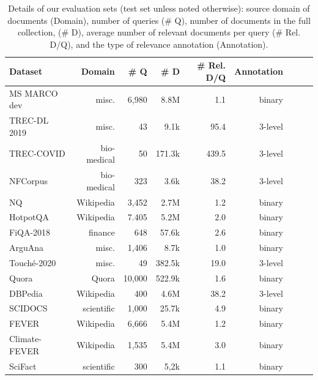 \documentclass{article}
\begin{document}
\begin{table}[tb!] 
    \caption{Details of our evaluation sets (test set unless noted otherwise): source domain of documents (Domain), number of queries (\# Q), number of documents in the full collection, (\# D), average number of relevant documents per query (\# Rel. D/Q), and the type of relevance annotation (Annotation). 
    }
    \centering \small
    \begin{tabular}{l r r r r r r r r}
        \toprule
        \textbf{Dataset} & \textbf{Domain} & \textbf{\# Q} & \textbf{\# D} & \textbf{\# Rel. D/Q} & \textbf{Annotation}\\
        \midrule
MS MARCO dev & misc. & 6,980 & 8.8M & 1.1 & binary & \\
TREC-DL 2019 & misc. & 43 & 9.1k & 95.4 & 3-level & \\
TREC-COVID & bio-medical & 50 & 171.3k & 439.5 & 3-level & \\
NFCorpus & bio-medical & 323 & 3.6k & 38.2 & 3-level & \\
NQ & Wikipedia & 3,452 & 2.7M & 1.2 & binary & \\
HotpotQA & Wikipedia & 7.405 & 5.2M & 2.0 & binary & \\
FiQA-2018 & finance & 648 & 57.6k & 2.6 & binary & \\
ArguAna & misc. & 1,406 & 8.7k & 1.0 & binary & \\
Touché-2020 & misc. & 49 & 382.5k & 19.0 & 3-level & \\
Quora & Quora & 10,000 & 522.9k & 1.6 & binary & \\
DBPedia & Wikipedia & 400 & 4.6M & 38.2 & 3-level & \\
SCIDOCS & scientific & 1,000 & 25.7k & 4.9 & binary & \\
FEVER & Wikipedia & 6,666 & 5.4M & 1.2 & binary & \\
Climate-FEVER & Wikipedia & 1,535 & 5.4M & 3.0 & binary & \\
SciFact & scientific  & 300 & 5,2k & 1.1 & binary & \\
    \bottomrule
    \end{tabular} 
    \label{tab:data_stats}
\end{table}
 
\end{document}
